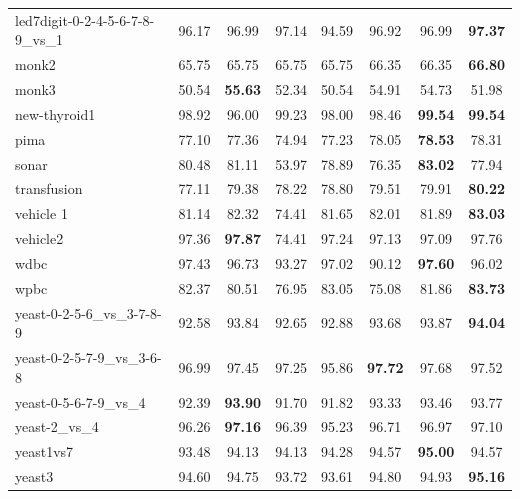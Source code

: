\begin{table}[!p]
{\begin{tabular}{lccccccc}
led7digit-0-2-4-5-6-7-8-9\_vs\_1 & 96.17 & 96.99 & 97.14 & 94.59 & 96.92 & 96.99 & \textbf{97.37} \\
monk2 & 65.75 & 65.75 & 65.75 & 65.75 & 66.35 & 66.35 & \textbf{66.80} \\
monk3 & 50.54 & \textbf{55.63} & 52.34 & 50.54 & 54.91 & 54.73 & 51.98 \\
new-thyroid1 & 98.92 & 96.00 & 99.23 & 98.00 & 98.46 & \textbf{99.54} & \textbf{99.54} \\
pima & 77.10 & 77.36 & 74.94 & 77.23 & 78.05 & \textbf{78.53} & 78.31 \\
sonar & 80.48 & 81.11 & 53.97 & 78.89 & 76.35 & \textbf{83.02} & 77.94 \\
transfusion & 77.11 & 79.38 & 78.22 & 78.80 & 79.51 & 79.91 & \textbf{80.22} \\
vehicle 1 & 81.14 & 82.32 & 74.41 & 81.65 & 82.01 & 81.89 & \textbf{83.03} \\
vehicle2 & 97.36 & \textbf{97.87} & 74.41 & 97.24 & 97.13 & 97.09 & 97.76 \\
wdbc & 97.43 & 96.73 & 93.27 & 97.02 & 90.12 & \textbf{97.60} & 96.02 \\
wpbc & 82.37 & 80.51 & 76.95 & 83.05 & 75.08 & 81.86 & \textbf{83.73} \\
yeast-0-2-5-6\_vs\_3-7-8-9 & 92.58 & 93.84 & 92.65 & 92.88 & 93.68 & 93.87 & \textbf{94.04} \\
yeast-0-2-5-7-9\_vs\_3-6-8 & 96.99 & 97.45 & 97.25 & 95.86 & \textbf{97.72} & 97.68 & 97.52 \\
yeast-0-5-6-7-9\_vs\_4 & 92.39 & \textbf{93.90} & 91.70 & 91.82 & 93.33 & 93.46 & 93.77 \\
yeast-2\_vs\_4 & 96.26 & \textbf{97.16} & 96.39 & 95.23 & 96.71 & 96.97 & 97.10 \\
yeast1vs7 & 93.48 & 94.13 & 94.13 & 94.28 & 94.57 & \textbf{95.00} & 94.57 \\
yeast3 & 94.60 & 94.75 & 93.72 & 93.61 & 94.80 & 94.93 & \textbf{95.16} \\
\bottomrule
\end{tabular}}
\end{table}
